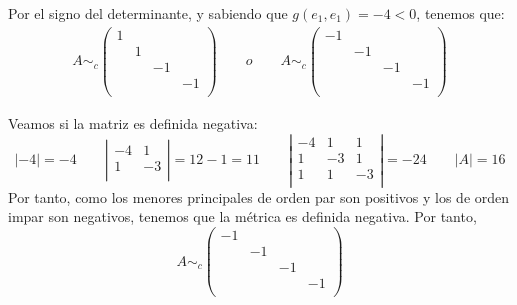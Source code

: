 \begin{ejercicio}
    Por el signo del determinante, y sabiendo que $g(e_1, e_1)=-4 <0$, tenemos que:
    \begin{gather*}
        A\sim_c\left(\begin{array}{cccc}
             1&&&  \\
             &1&& \\
             &&-1& \\
             &&&-1 \\
        \end{array}\right)
        \qquad o \qquad
        A\sim_c\left(\begin{array}{cccc}
             -1&&&  \\
             &-1&& \\
             &&-1& \\
             &&&-1 \\
        \end{array}\right)
    \end{gather*}

    Veamos si la matriz es definida negativa:
    \begin{equation*}
        |-4| = -4 \qquad
        \left| \begin{array}{cc}
            -4 & 1 \\
            1 & -3\\
        \end{array}\right| = 12 -1 = 11
        \qquad
        \left| \begin{array}{cccc}
            -4 & 1 & 1 \\
            1 & -3 & 1 \\
            1 & 1 & -3 \\
        \end{array}\right| = -24
        \qquad |A|=16
    \end{equation*}
    Por tanto, como los menores principales de orden par son positivos y los de orden impar son negativos, tenemos que la métrica es definida negativa. Por tanto,
    \begin{equation*}
        A\sim_c\left(\begin{array}{cccc}
             -1&&&  \\
             &-1&& \\
             &&-1& \\
             &&&-1 \\
        \end{array}\right)
    \end{equation*}
\end{ejercicio}
